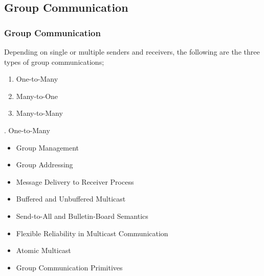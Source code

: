 \documentclass{beamer}
\begin{document}
\subsection{Group Communication}
\begin{frame}[allowframebreaks]
	\frametitle{Group Communication}
	Depending on single or multiple senders and receivers, the following are the three 
	types of group communications;
	\begin{enumerate}
		\item One-to-Many
		\item Many-to-One
		\item Many-to-Many
	\end{enumerate}	
	\vspace{4cm}
	. One-to-Many
	\begin{itemize}
				\item Group Management
				\item Group Addressing
				\item Message Delivery to Receiver Process
				\item Buffered and Unbuffered Multicast
				\item Send-to-All and Bulletin-Board Semantics
				\item Flexible Reliability in Multicast Communication
				\item Atomic Multicast
				\item Group Communication Primitives
		\end{itemize}
		\vspace{2cm}
\end{frame}
\end{document}
